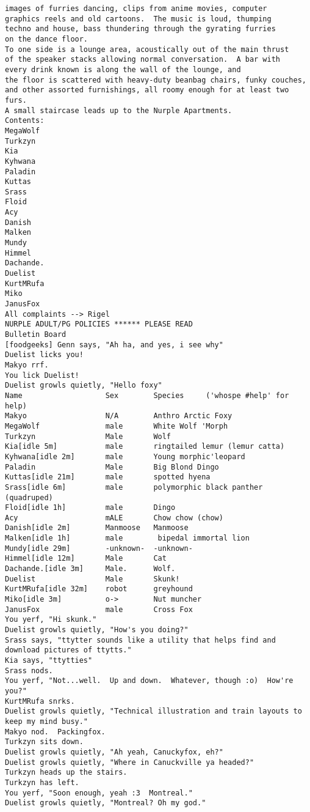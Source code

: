 \begin{verbatim}
images of furries dancing, clips from anime movies, computer
graphics reels and old cartoons.  The music is loud, thumping
techno and house, bass thundering through the gyrating furries
on the dance floor.
To one side is a lounge area, acoustically out of the main thrust
of the speaker stacks allowing normal conversation.  A bar with
every drink known is along the wall of the lounge, and
the floor is scattered with heavy-duty beanbag chairs, funky couches,
and other assorted furnishings, all roomy enough for at least two furs.
A small staircase leads up to the Nurple Apartments.
Contents:
MegaWolf
Turkzyn
Kia
Kyhwana
Paladin
Kuttas
Srass
Floid
Acy
Danish
Malken
Mundy
Himmel
Dachande.
Duelist
KurtMRufa
Miko
JanusFox
All complaints --> Rigel
NURPLE ADULT/PG POLICIES ****** PLEASE READ
Bulletin Board
[foodgeeks] Genn says, "Ah ha, and yes, i see why"
Duelist licks you!
Makyo rrf.
You lick Duelist!
Duelist growls quietly, "Hello foxy"
Name                   Sex        Species     ('whospe #help' for help)
Makyo                  N/A        Anthro Arctic Foxy
MegaWolf               male       White Wolf 'Morph
Turkzyn                Male       Wolf
Kia[idle 5m]           male       ringtailed lemur (lemur catta)
Kyhwana[idle 2m]       male       Young morphic'leopard
Paladin                Male       Big Blond Dingo
Kuttas[idle 21m]       male       spotted hyena
Srass[idle 6m]         male       polymorphic black panther (quadruped)
Floid[idle 1h]         male       Dingo
Acy                    mALE       Chow chow (chow)
Danish[idle 2m]        Manmoose   Manmoose
Malken[idle 1h]        male        bipedal immortal lion
Mundy[idle 29m]        -unknown-  -unknown-
Himmel[idle 12m]       Male       Cat
Dachande.[idle 3m]     Male.      Wolf.
Duelist                Male       Skunk!
KurtMRufa[idle 32m]    robot      greyhound
Miko[idle 3m]          o->        Nut muncher
JanusFox               male       Cross Fox
You yerf, "Hi skunk."
Duelist growls quietly, "How's you doing?"
Srass says, "ttytter sounds like a utility that helps find and download pictures of ttytts."
Kia says, "ttytties"
Srass nods.
You yerf, "Not...well.  Up and down.  Whatever, though :o)  How're you?"
KurtMRufa snrks.
Duelist growls quietly, "Technical illustration and train layouts to keep my mind busy."
Makyo nod.  Packingfox.
Turkzyn sits down.
Duelist growls quietly, "Ah yeah, Canuckyfox, eh?"
Duelist growls quietly, "Where in Canuckville ya headed?"
Turkzyn heads up the stairs.
Turkzyn has left.
You yerf, "Soon enough, yeah :3  Montreal."
Duelist growls quietly, "Montreal? Oh my god."

\end{verbatim}
